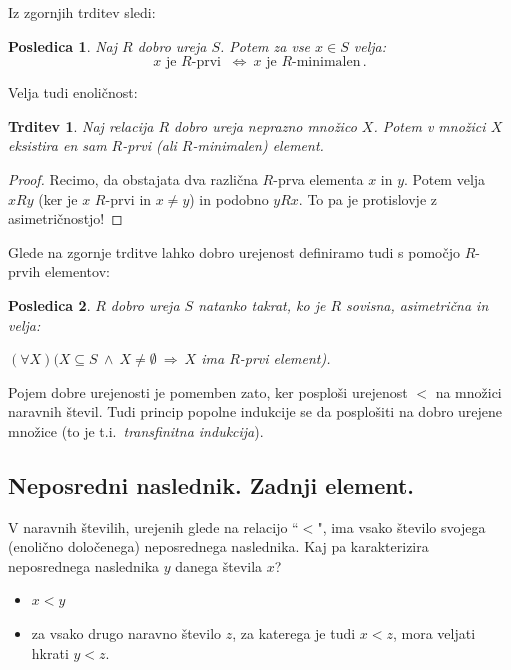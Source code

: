 \documentclass[11pt,paper=b5,DIV=13,headinclude,footinclude]{scrbook}
\def\inn {{~\wedge~}}
\def\sledi {{~\Rightarrow~}}
\def\cee {{~\Leftrightarrow~}}
\newtheorem*{trditev}{Trditev}
\newtheorem*{posledica}{Posledica}
\begin{document}
Iz zgornjih trditev sledi:

\begin{posledica}
Naj $R$ dobro ureja $S$. Potem za vse $x\in S$ velja:
$$x \textrm{ je } R\textrm{-prvi } \cee x \textrm{ je } R\textrm{-minimalen}\,.$$
\end{posledica}

Velja tudi enoličnost:

\begin{trditev}
Naj relacija $R$ dobro ureja neprazno množico $X$. Potem v množici $X$ eksistira {\em en sam} $R$-prvi (ali $R$-minimalen) element.
\end{trditev}

\begin{proof}
Recimo, da obstajata dva različna $R$-prva elementa $x$ in $y$.
Potem velja $xRy$ (ker je $x$ $R$-prvi in $x\neq y$) in podobno $yRx$.
To pa je protislovje z asimetričnostjo!
\end{proof}

\bigskip
Glede na zgornje trditve lahko dobro urejenost definiramo tudi s pomočjo $R$-prvih elementov:

\begin{posledica}
$R$ dobro ureja $S$ natanko takrat, ko je $R$ sovisna, asimetrična in velja:

$(\forall X)(X\subseteq S\inn X\neq\emptyset\sledi X$ ima $R$-prvi element).
\end{posledica}


Pojem dobre urejenosti je pomemben zato, ker posploši urejenost $<$ na množici naravnih števil. Tudi princip popolne indukcije se da posplošiti na dobro urejene množice (to je t.i.~{\em transfinitna indukcija}).



\subsection*{Neposredni naslednik. Zadnji element.}

V naravnih številih, urejenih glede na relacijo ``$<$", ima vsako število svojega (enolično določenega) neposrednega naslednika. Kaj pa karakterizira neposrednega naslednika $y$ danega števila $x$?
\begin{itemize}
  \item $x<y$
  \item za vsako drugo naravno število $z$, za katerega je tudi $x<z$, mora veljati hkrati $y<z$.
\end{itemize}
\end{document}
